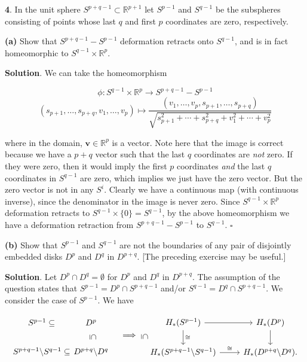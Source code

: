 \documentclass{article}
\newcommand{\R}{\mathbb{R}}
\begin{document}
\tab \textbf{4}. In the unit sphere $S^{p+q-1}\subset \R^{p+1}$ let $S^{p-1}$ and $S^{q-1}$ be the subspheres consisting of points whose last $q$ and first $p$ coordinates are zero, respectively.
\medskip

\textbf{(a)} Show that $S^{p+q-1} - S^{p-1}$ deformation retracts onto $S^{q-1}$, and is in fact homeomorphic to $S^{q-1}\times \R^{p}$.
\medskip

\textbf{Solution}. We can take the homeomorphism

$$\phi: S^{q-1}\times \R^{p}\to S^{p+q-1}-S^{p-1}$$
$$(s_{p+1},\ldots, s_{p+q}, v_{1},\ldots, v_{p})\mapsto \frac{(v_{1},\ldots, v_{p}, s_{p+1},\ldots, s_{p+q})}{\sqrt{s_{p+1}^{2}+\cdots + s_{p+q}^{2} + v_{1}^{2} + \cdots + v_{p}^{2}}}$$

where in the domain, $\mathbf{v}\in \R^{p}$ is a vector. Note here that the image is correct because we have a $p + q$ vector such that the last $q$ coordinates are \textit{not} zero. If they were zero, then it would imply the first $p$ coordinates \textit{and} the last $q$ coordinates in $S^{q-1}$ are zero, which implies we just have the zero vector. But the zero vector is not in any $S^{i}$. Clearly we have a continuous map (with continuous inverse), since the denominator in the image is never zero. Since $S^{q-1}\times \R^{p}$ deformation retracts to $S^{q-1}\times \{0\} = S^{q-1}$, by the above homeomorphism we have a deformation retraction from $S^{p+q-1}-S^{p-1}$ to $S^{q-1}$. $\square$
\medskip

\textbf{(b)} Show that $S^{p-1}$ and $S^{q-1}$ are not the boundaries of any pair of disjointly embedded disks $D^{p}$ and $D^{q}$ in $D^{p+q}$. [The preceding exercise may be useful.]
\medskip

\textbf{Solution}.  Let $D^{p}\cap D^{q} = \emptyset$ for $D^{p}$ and $D^{q}$ in $D^{p+q}$. The assumption of the question states that $S^{p-1} = D^{p}\cap S^{p+q-1}$ and/or $S^{q-1} = D^{q}\cap S^{p+q-1}$. We consider the case of $S^{p-1}$. We have

\[\begin{tikzcd}[remember picture]
S^{p-1} \subseteq & \hspace{-1cm} D^{p}\\
S^{p+q-1}\textnormal{\textbackslash} S^{q-1} \subseteq & \hspace{-1cm} D^{p+q}\textnormal{\textbackslash} D^{q}
\end{tikzcd}
\begin{tikzpicture}[overlay, remember picture]
\path (\tikzcdmatrixname-1-1) to node[midway,sloped]{$\subseteq$}
(\tikzcdmatrixname-2-1); \hspace{-0.4cm}
\path (\tikzcdmatrixname-1-2) to  node[midway,sloped]{$\subseteq$} 
(\tikzcdmatrixname-2-2);\hspace{0.55cm}
\end{tikzpicture}\quad \Longrightarrow\quad \begin{tikzcd}
H_{\ast}(S^{p-1})\arrow{r}\arrow{d}{\cong} & H_{\ast}(D^{p})\arrow{d}\\
H_{\ast}(S^{p+q-1}\textnormal{\textbackslash} S^{q-1})\arrow{r}{\cong} & H_{\ast}(D^{p+q}\textnormal{\textbackslash} D^{q}).
\end{tikzcd}\]
\end{document}
